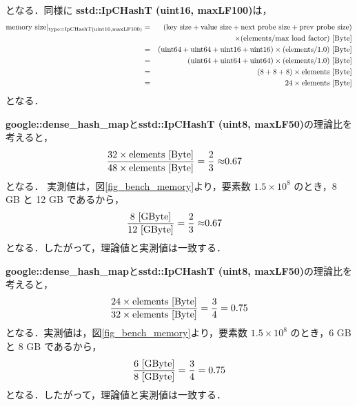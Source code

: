 となる．同様に {\bf sstd::IpCHashT (uint16, maxLF100)}は，
\begin{eqnarray*}
  {\rm memory\ size|_{type=IpCHashT (uint16, maxLF100)}} &=& ({\rm key\ size} + {\rm value\ size} + {\rm next\ probe\ size} + {\rm prev\ probe\ size})\\
                                              & & \times ({\rm elements} / {\rm max\ load\ factor}) {\rm\ [Byte]}\\
  &=& ({\rm uint64} + {\rm uint64} + {\rm uint16} + {\rm uint16}) \times ({\rm elements} / 1.0) {\rm\ [Byte]}\\
  &=& ({\rm uint64} + {\rm uint64} + {\rm uint64}) \times ({\rm elements} / 1.0) {\rm\ [Byte]}\\
  &=& (8 + 8 + 8) \times {\rm elements} {\rm\ [Byte]}\\
  &=& 24 \times {\rm elements} {\rm\ [Byte]}
\end{eqnarray*}
となる．

{\bf google::dense\_hash\_map}と{\bf sstd::IpCHashT (uint8, maxLF50)}の理論比を考えると，
\begin{eqnarray*}
  \frac{32 \times {\rm elements} {\rm\ [Byte]}}{48 \times {\rm elements} {\rm\ [Byte]}}
  = \frac{2}{3}\approx& 0.67
\end{eqnarray*}
となる．
実測値は，図\ref{fig_bench_memory}より，要素数 $1.5\times 10^8$ のとき，8 GB と 12 GB であるから，
\begin{eqnarray*}
  \frac{8 {\rm\ [GByte]}}{12 {\rm\ [GByte]}}
  = \frac{2}{3}\approx& 0.67
\end{eqnarray*}
となる．したがって，理論値と実測値は一致する．

{\bf google::dense\_hash\_map}と{\bf sstd::IpCHashT (uint8, maxLF50)}の理論比を考えると，
\begin{eqnarray*}
  \frac{24 \times {\rm elements} {\rm\ [Byte]}}{32 \times {\rm elements} {\rm\ [Byte]}}
  = \frac{3}{4}= 0.75
\end{eqnarray*}
となる．実測値は，図\ref{fig_bench_memory}より，要素数 $1.5\times 10^8$ のとき，6 GB と 8 GB であるから，
\begin{eqnarray*}
  \frac{6 {\rm\ [GByte]}}{8 {\rm\ [GByte]}}
  = \frac{3}{4}= 0.75
\end{eqnarray*}
となる．したがって，理論値と実測値は一致する．


